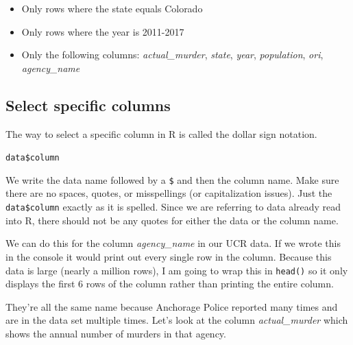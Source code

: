 \documentclass[
]{krantz}
\makeatletter
\newenvironment{Shaded}{\begin{snugshade}}{\end{snugshade}}
\newcommand{\CommentTok}[1]{\textcolor[rgb]{0.37,0.37,0.37}{\textit{#1}}}
\newcommand{\FunctionTok}[1]{\textcolor[rgb]{0,0,0}{#1}}
\newcommand{\NormalTok}[1]{#1}
\newcommand{\SpecialCharTok}[1]{\textcolor[rgb]{0,0,0}{#1}}
\providecommand{\tightlist}{%
  \setlength{\itemsep}{0pt}\setlength{\parskip}{0pt}}
\newenvironment{kframe}{%
\medskip{}
\setlength{\fboxsep}{.8em}
 \def\at@end@of@kframe{}%
 \ifinner\ifhmode%
  \def\at@end@of@kframe{\end{minipage}}%
  \begin{minipage}{\columnwidth}%
 \fi\fi%
 \def\FrameCommand##1{\hskip\@totalleftmargin \hskip-\fboxsep
 \colorbox{shadecolor}{##1}\hskip-\fboxsep
     \hskip-\linewidth \hskip-\@totalleftmargin \hskip\columnwidth}%
 \MakeFramed {\advance\hsize-\width
   \@totalleftmargin\z@ \linewidth\hsize
   \@setminipage}}%
 {\par\unskip\endMakeFramed%
 \at@end@of@kframe}
\renewenvironment{Shaded}{\begin{kframe}}{\end{kframe}}
\makeatother
\begin{document}
\begin{itemize}
\tightlist
\item
  Only rows where the state equals Colorado
\item
  Only rows where the year is 2011-2017
\item
  Only the following columns: \emph{actual\_murder}, \emph{state}, \emph{year}, \emph{population}, \emph{ori}, \emph{agency\_name}
\end{itemize}

\hypertarget{select-specific-columns}{%
\subsection{Select specific columns}\label{select-specific-columns}}

The way to select a specific column in R is called the dollar sign notation.

\texttt{data\$column}

We write the data name followed by a \texttt{\$} and then the column name. Make sure there are no spaces, quotes, or misspellings (or capitalization issues). Just the \texttt{data\$column} exactly as it is spelled. Since we are referring to data already read into R, there should not be any quotes for either the data or the column name.

We can do this for the column \emph{agency\_name} in our UCR data. If we wrote this in the console it would print out every single row in the column. Because this data is large (nearly a million rows), I am going to wrap this in \texttt{head()} so it only displays the first 6 rows of the column rather than printing the entire column.

\begin{Shaded}
\end{Shaded}

They're all the same name because Anchorage Police reported many times and are in the data set multiple times. Let's look at the column \emph{actual\_murder} which shows the annual number of murders in that agency.

\begin{Shaded}
\end{Shaded}
\end{document}
